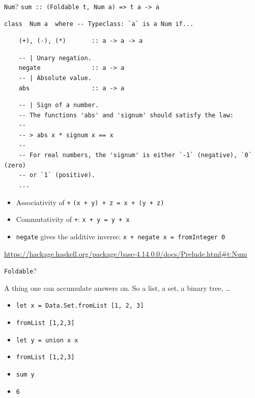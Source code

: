 \documentclass[8pt]{beamer}
\newcommand{\raw}[1]{\texttt{#1}}
\newcommand{\hs}[1]{\texttt{#1}}
\begin{document}
\begin{frame}[fragile]{\texttt{Num}?}
\hs{sum :: (Foldable t, Num a) => t a -> a}

\pause
\begin{verbatim}
class  Num a  where -- Typeclass: `a` is a Num if...
\end{verbatim}
\pause
\begin{verbatim}
    (+), (-), (*)       :: a -> a -> a
\end{verbatim}
\pause
\begin{verbatim}
    -- | Unary negation.
    negate              :: a -> a
    -- | Absolute value.
    abs                 :: a -> a
\end{verbatim}
\pause
\begin{verbatim}
    -- | Sign of a number.
    -- The functions 'abs' and 'signum' should satisfy the law:
    --
    -- > abs x * signum x == x
    --
    -- For real numbers, the 'signum' is either `-1` (negative), `0` (zero)
    -- or `1` (positive).
    ...
\end{verbatim}

\pause
\begin{itemize}
    \item Associativity of \raw{+} \raw{(x + y) + z = x + (y + z)} \pause
    \item Commutativity of \raw{+}: \raw{x + y = y + x} \pause
    \item \raw{negate} gives the additive inverse: \raw{x + negate x = fromInteger 0} \pause
\end{itemize}

\pause
\url{https://hackage.haskell.org/package/base-4.14.0.0/docs/Prelude.html#t:Num}

\end{frame}

\begin{frame}[fragile]{\texttt{Foldable}?}

A thing one can accumulate answers on. So a list, a set, a binary tree, \dots

\begin{itemize}
    \item \hs{let x = Data.Set.fromList [1, 2, 3]} \pause
    \item \hs{fromList [1,2,3]} \pause
    \item \hs{let y = union x x} \pause
    \item \raw{fromList [1,2,3]} \pause
    \item \hs{sum y}
    \item \raw{6}
\end{itemize}
\end{frame}
\end{document}
